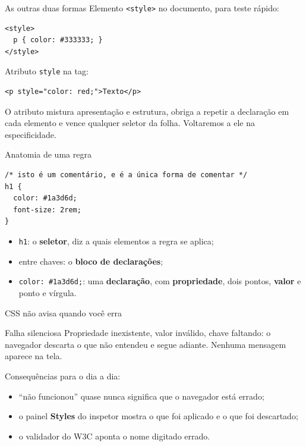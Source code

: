 \documentclass{beamer}
\begin{document}
\begin{frame}[fragile]{As outras duas formas}
	Elemento \texttt{<style>} no documento, para teste rápido:

	\begin{verbatim}
<style>
  p { color: #333333; }
</style>
  \end{verbatim}

	\vspace{0.2cm}
	Atributo \texttt{style} na tag:

	\begin{verbatim}
<p style="color: red;">Texto</p>
  \end{verbatim}

	\vspace{0.2cm}
	O atributo mistura apresentação e estrutura, obriga a repetir a declaração em
	cada elemento e vence qualquer seletor da folha. Voltaremos a ele na
	especificidade.
\end{frame}

\begin{frame}[fragile]{Anatomia de uma regra}
	\begin{verbatim}
/* isto é um comentário, e é a única forma de comentar */
h1 {
  color: #1a3d6d;
  font-size: 2rem;
}
  \end{verbatim}

	\vspace{0.2cm}
	\begin{itemize}
		\item \texttt{h1}: o \textbf{seletor}, diz a quais elementos a regra se aplica;
		\item entre chaves: o \textbf{bloco de declarações};
		\item \texttt{color: \#1a3d6d;}: uma \textbf{declaração}, com
		      \textbf{propriedade}, dois pontos, \textbf{valor} e ponto e vírgula.
	\end{itemize}
\end{frame}

\begin{frame}{CSS não avisa quando você erra}
	\begin{alertblock}{Falha silenciosa}
		Propriedade inexistente, valor inválido, chave faltando: o navegador
		descarta o que não entendeu e segue adiante. Nenhuma mensagem aparece na
		tela.
	\end{alertblock}

	\vspace{0.5cm}
	Consequências para o dia a dia:

	\begin{itemize}
		\item ``não funcionou'' quase nunca significa que o navegador está errado;
		\item o painel \textbf{Styles} do inspetor mostra o que foi aplicado e o que
		      foi descartado;
		\item o validador do W3C aponta o nome digitado errado.
	\end{itemize}
\end{frame}
\end{document}
